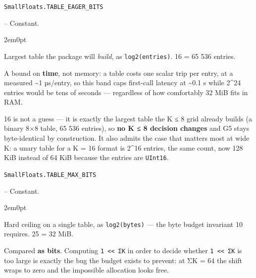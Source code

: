 \par\medskip\noindent\begin{minipage}{\linewidth}
\hypertarget{9750648865235355525}{\texttt{SmallFloats.TABLE\_\allowbreak{}EAGER\_\allowbreak{}BITS}}  -- {Constant.}
\nopagebreak
\begin{adjustwidth}{2em}{0pt}

Largest table the package will \emph{build}, as \texttt{log2(entries)}. 16 = 65 536 entries.

A bound on \textbf{time}, not memory: a table costs one scalar trip per entry, at a measured {\textasciitilde}1 µs/entry, so this band caps first-call latency at {\textasciitilde}0.1 s while 2{\textasciicircum}24 entries would be tens of seconds — regardless of how comfortably 32 MiB fits in RAM.

16 is not a guess — it is exactly the largest table the K ≤ 8 grid already builds (a binary 8×8 table, 65 536 entries), so \textbf{no K ≤ 8 decision changes} and G5 stays byte-identical by construction. It also admits the case that matters most at wide K: a unary table for a K = 16 format is 2{\textasciicircum}16 entries, the same count, now 128 KiB instead of 64 KiB because the entries are \texttt{UInt16}.



\end{adjustwidth}
\end{minipage}
\par\medskip

\par\medskip\noindent\begin{minipage}{\linewidth}
\hypertarget{13361470731934248224}{\texttt{SmallFloats.TABLE\_\allowbreak{}MAX\_\allowbreak{}BITS}}  -- {Constant.}
\nopagebreak
\begin{adjustwidth}{2em}{0pt}

Hard ceiling on a single table, as \texttt{log2(bytes)} — the byte budget invariant 10 requires. 25 = 32 MiB.

Compared \textbf{as bits}. Computing \texttt{1 << ΣK} in order to decide whether \texttt{1 << ΣK} is too large is exactly the bug the budget exists to prevent: at ΣK = 64 the shift wraps to zero and the impossible allocation looks free.



\end{adjustwidth}
\end{minipage}
\par\medskip

